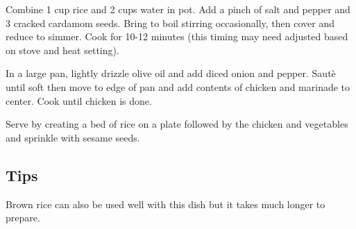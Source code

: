 Combine 1 cup rice and 2 cups water in pot. Add a pinch of salt and pepper and 3 cracked cardamom seeds. Bring to boil stirring occasionally, then cover and reduce to simmer. Cook for 10-12 minutes (this timing may need adjusted based on stove and heat setting). 

In a large pan, lightly drizzle olive oil and add diced onion and pepper. Saut\`{e} until soft then move to edge of pan and add contents of chicken and marinade to center. Cook until chicken is done. 

Serve by creating a bed of rice on a plate followed by the chicken and vegetables and sprinkle with sesame seeds.

\subsection*{Tips}
Brown rice can also be used well with this dish but it takes much longer to prepare. 

	